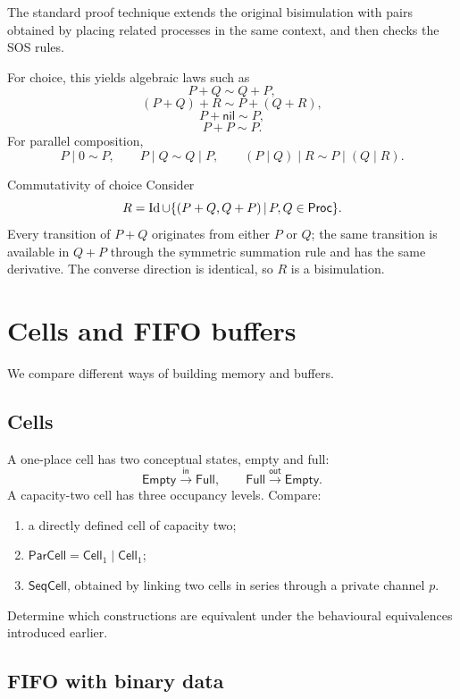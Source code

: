 \documentclass[a4paper]{article}
\newcommand{\Proc}{\mathsf{Proc}}
\newcommand{\nil}{\mathsf{nil}}
\newcommand{\Id}{\operatorname{Id}}
\newcommand{\trans}[1]{\xrightarrow{#1}}
\begin{document}
The standard proof technique extends the original bisimulation with pairs obtained by placing related processes in the same context, and then checks the SOS rules.

For choice, this yields algebraic laws such as
\[
    P+Q\sim Q+P,
\]
\[
    (P+Q)+R\sim P+(Q+R),
\]
\[
    P+\nil\sim P,
\]
\[
    P+P\sim P.
\]
For parallel composition,
\[
    P\mid0\sim P,
    \qquad
    P\mid Q\sim Q\mid P,
    \qquad
    (P\mid Q)\mid R\sim P\mid(Q\mid R).
\]

\begin{snippetproof}{Commutativity of choice}
    Consider
    \[
        R=\Id\union\{(P+Q,Q+P)\suchthat P,Q\in\Proc\}.
    \]
    Every transition of \(P+Q\) originates from either \(P\) or \(Q\); the same transition is available in \(Q+P\) through the symmetric summation rule and has the same derivative.
    The converse direction is identical, so \(R\) is a bisimulation.
\end{snippetproof}

\section{Cells and FIFO buffers}

We compare different ways of building memory and buffers.

\subsection{Cells}

A one-place cell has two conceptual states, empty and full:
\[
    \mathsf{Empty}\trans{\mathsf{in}}\mathsf{Full},
    \qquad
    \mathsf{Full}\trans{\mathsf{out}}\mathsf{Empty}.
\]
A capacity-two cell has three occupancy levels.
Compare:
\begin{enumerate}
    \item a directly defined cell of capacity two;
    \item \(\mathsf{ParCell}=\mathsf{Cell}_1\mid\mathsf{Cell}_1\);
    \item \(\mathsf{SeqCell}\), obtained by linking two cells in series through a private channel \(p\).
\end{enumerate}
Determine which constructions are equivalent under the behavioural equivalences introduced earlier.

\subsection{FIFO with binary data}
\end{document}
